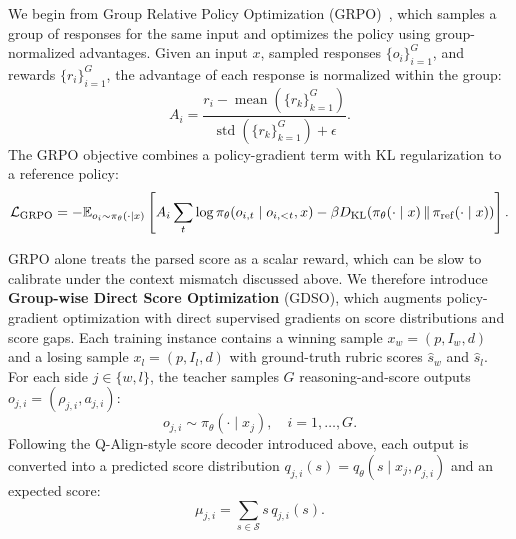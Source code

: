 \documentclass{article}
\newcommand{\teaname}{GDSO\xspace}
\begin{document}
We begin from Group Relative Policy Optimization (GRPO)~\cite{deepseek-math}, which samples a group of responses for the same input and optimizes the policy using group-normalized advantages. Given an input $x$, sampled responses $\{o_i\}_{i=1}^{G}$, and rewards $\{r_i\}_{i=1}^{G}$, the advantage of each response is normalized within the group:
\begin{equation}
A_i = \frac{r_i - \operatorname{mean}(\{r_k\}_{k=1}^{G})}
{\operatorname{std}(\{r_k\}_{k=1}^{G}) + \epsilon}.
\label{eq:grpo-advantage}
\end{equation}
The GRPO objective combines a policy-gradient term with KL regularization to a reference policy:
\begin{equation}
\mathcal{L}_{\mathrm{GRPO}}
=
-\mathbb{E}_{o_i \sim \pi_\theta(\cdot \mid x)}
\left[
A_i \sum_t \log \pi_\theta(o_{i,t} \mid o_{i,<t},x)
- \beta D_{\mathrm{KL}}\!\left(\pi_\theta(\cdot \mid x)\,\|\,\pi_{\mathrm{ref}}(\cdot \mid x)\right)
\right].
\label{eq:grpo-objective}
\end{equation}

GRPO alone treats the parsed score as a scalar reward, which can be slow to calibrate under the context mismatch discussed above. We therefore introduce \textbf{Group-wise Direct Score Optimization} (\teaname), which augments policy-gradient optimization with direct supervised gradients on score distributions and score gaps. Each training instance contains a winning sample $x_w=(p,I_w,d)$ and a losing sample $x_l=(p,I_l,d)$ with ground-truth rubric scores $\hat{s}_w$ and $\hat{s}_l$. For each side $j \in \{w,l\}$, the teacher samples $G$ reasoning-and-score outputs $o_{j,i}=(\rho_{j,i},a_{j,i})$:
\begin{equation}
o_{j,i} \sim \pi_\theta(\cdot \mid x_j), \quad i=1,\ldots,G.
\label{eq:gdso-sampling}
\end{equation}
Following the Q-Align-style score decoder introduced above, each output is converted into a predicted score distribution $q_{j,i}(s)=q_\theta(s\mid x_j,\rho_{j,i})$ and an expected score:
\begin{equation}
\mu_{j,i} = \sum_{s \in \mathcal{S}} s \, q_{j,i}(s).
\label{eq:parsed-score}
\end{equation}
\end{document}
